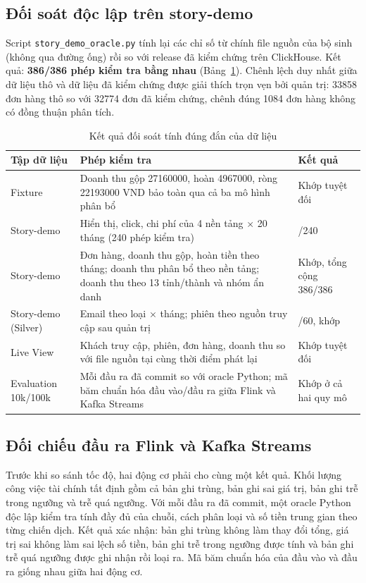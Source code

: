 \subsection{Đối soát độc lập trên story-demo}
\label{sec:c5-oracle}
Script \texttt{story\_demo\_oracle.py} tính lại các chỉ số từ chính file nguồn của bộ sinh (không qua đường ống) rồi so với release đã kiểm chứng trên ClickHouse. Kết quả: \textbf{386/386 phép kiểm tra bằng nhau} (Bảng~\ref{tab:correctness}). Chênh lệch duy nhất giữa dữ liệu thô và dữ liệu đã kiểm chứng được giải thích trọn vẹn bởi quản trị: \num{33858} đơn hàng thô so với \num{32774} đơn đã kiểm chứng, chênh đúng \num{1084} đơn hàng không có đồng thuận phân tích.

\begin{table}[H]
\centering
\caption{Kết quả đối soát tính đúng đắn của dữ liệu}
\label{tab:correctness}
\small
\renewcommand{\arraystretch}{1.2}
\begin{tabularx}{\textwidth}{>{\raggedright\arraybackslash}p{3.6cm} >{\raggedright\arraybackslash}X >{\raggedright\arraybackslash}p{3.2cm}}
\toprule
\textbf{Tập dữ liệu} & \textbf{Phép kiểm tra} & \textbf{Kết quả} \\
\midrule
Fixture & Doanh thu gộp \num{27160000}, hoàn \num{4967000}, ròng \num{22193000} VND bảo toàn qua cả ba mô hình phân bổ & Khớp tuyệt đối \\
Story-demo & Hiển thị, click, chi phí của 4 nền tảng $\times$ 20 tháng (240 phép kiểm tra) & 240/240 \\
Story-demo & Đơn hàng, doanh thu gộp, hoàn tiền theo tháng; doanh thu phân bổ theo nền tảng; doanh thu theo 13 tỉnh/thành và nhóm ẩn danh & Khớp, tổng cộng 386/386 \\
Story-demo (Silver) & Email theo loại $\times$ tháng; phiên theo nguồn truy cập sau quản trị & 60/60, khớp \\
Live View & Khách truy cập, phiên, đơn hàng, doanh thu so với file nguồn tại cùng thời điểm phát lại & Khớp tuyệt đối \\
Evaluation 10k/100k & Mỗi đầu ra đã commit so với oracle Python; mã băm chuẩn hóa đầu vào/đầu ra giữa Flink và Kafka Streams & Khớp ở cả hai quy mô \\
\bottomrule
\end{tabularx}
\end{table}

\subsection{Đối chiếu đầu ra Flink và Kafka Streams}
\label{sec:c5-tuong-duong}
Trước khi so sánh tốc độ, hai động cơ phải cho cùng một kết quả. Khối lượng công việc tài chính tất định gồm cả bản ghi trùng, bản ghi sai giá trị, bản ghi trễ trong ngưỡng và trễ quá ngưỡng. Với mỗi đầu ra đã commit, một oracle Python độc lập kiểm tra tính đầy đủ của chuỗi, cách phân loại và số tiền trung gian theo từng chiến dịch. Kết quả xác nhận: bản ghi trùng không làm thay đổi tổng, giá trị sai không làm sai lệch số tiền, bản ghi trễ trong ngưỡng được tính và bản ghi trễ quá ngưỡng được ghi nhận rồi loại ra. Mã băm chuẩn hóa của đầu vào và đầu ra giống nhau giữa hai động cơ.

